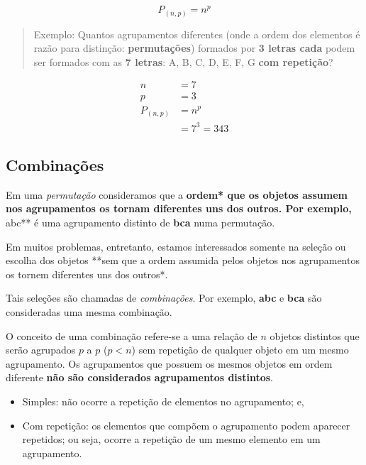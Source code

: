 \documentclass[
]{book}
\providecommand{\tightlist}{%
  \setlength{\itemsep}{0pt}\setlength{\parskip}{0pt}}
\begin{document}
\[
P_{(n,p)} =  n ^{p}
\]

\hfill\break

\begin{quote}
Exemplo: Quantos agrupamentos diferentes (onde a ordem dos elementos é razão para distinção: \textbf{permutações}) formados por \textbf{3 letras cada} podem ser formados com as \textbf{7 letras}: A, B, C, D, E, F, G \textbf{com repetição}?
\end{quote}

\hfill\break

\begin{align*}
n   &  = 7 \\
p   &  = 3 \\
P_{(n,p)} &  = n^{p} \\
          &   = 7 ^{3} = 343
\end{align*}

\hfill\break

\hypertarget{combinauxe7uxf5es}{%
\subsection{Combinações}\label{combinauxe7uxf5es}}

Em uma \emph{permutação} consideramos que a \textbf{ordem* que os objetos assumem nos agrupamentos os tornam diferentes uns dos outros. Por exemplo, }abc** é uma agrupamento distinto de \textbf{bca} numa permutação.

\hfill\break

Em muitos problemas, entretanto, estamos interessados somente na seleção ou escolha dos objetos **sem que a ordem assumida pelos objetos nos agrupamentos os tornem diferentes uns dos outros*.

\hfill\break

Tais seleções são chamadas de \emph{combinações}. Por exemplo, \textbf{abc} e \textbf{bca} são consideradas uma mesma combinação.

\hfill\break

O conceito de uma combinação refere-se a uma relação de \(n\) objetos distintos que serão agrupados \(p\) a \(p\) (\(p < n\)) sem repetição de qualquer objeto em um mesmo agrupamento. Os agrupamentos que possuem os mesmos objetos em ordem diferente \textbf{não são considerados agrupamentos distintos}.

\hfill\break

\begin{itemize}
\tightlist
\item
  Simples: não ocorre a repetição de elementos no agrupamento; e,\\
\item
  Com repetição: os elementos que compõem o agrupamento podem aparecer repetidos; ou seja, ocorre a repetição de um mesmo elemento em um agrupamento.
\end{itemize}
\end{document}
